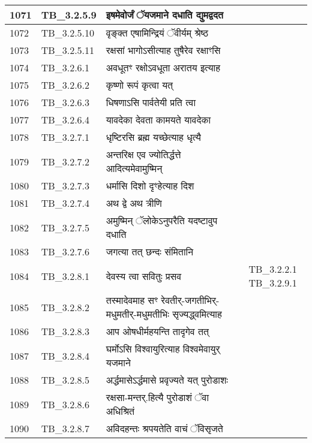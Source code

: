 \documentclass[17pt]{extarticle}
\begin{document}
\begin{longtable}{||p{0.4in}||p{0.9in}||p{4.0in}||p{0.9in}||}
        \hline
            1071 & TB\_3.2.5.9 & इषमेवोर्जं ॅयजमाने दधाति द्युमद्वदत &      \\
        \hline
            1072 & TB\_3.2.5.10 & वृङ्क्त एषामिन्द्रियं ॅवीर्यम् श्रेष्ठ &      \\
        \hline
            1073 & TB\_3.2.5.11 & रक्षसां भागोऽसीत्याह तुषैरेव रक्षाꣳसि &      \\
        \hline
            1074 & TB\_3.2.6.1 & अवधूतꣳ रक्षोऽवधूता अरातय इत्याह &      \\
        \hline
            1075 & TB\_3.2.6.2 & कृष्णो रूपं कृत्वा यत् &      \\
        \hline
            1076 & TB\_3.2.6.3 & धिषणाऽसि पार्वतेयी प्रति त्वा &      \\
        \hline
            1077 & TB\_3.2.6.4 & यावदेका देवता कामयते यावदेका &      \\
        \hline
            1078 & TB\_3.2.7.1 & धृष्टिरसि ब्रह्म यच्छेत्याह धृत्यै &      \\
        \hline
            1079 & TB\_3.2.7.2 & अन्तरिक्ष एव ज्योतिर्द्धत्ते आदित्यमेवामुष्मिन् &      \\
        \hline
            1080 & TB\_3.2.7.3 & धर्मासि दिशो दृꣳहेत्याह दिश &      \\
        \hline
            1081 & TB\_3.2.7.4 & अथ द्वे अथ त्रीणि &      \\
        \hline
            1082 & TB\_3.2.7.5 & अमुष्मिन् ॅलोकेऽनुपरैति यदष्टावुप दधाति &      \\
        \hline
            1083 & TB\_3.2.7.6 & जगत्या तत् छन्दः संमितानि &      \\
        \hline
            1084 & TB\_3.2.8.1 & देवस्य त्वा सवितुः प्रसव & TB\_3.2.2.1  TB\_3.2.9.1       \\
        \hline
            1085 & TB\_3.2.8.2 & तस्मादेवमाह सꣳ रेवतीर्{-}जगतीभिर्{-}मधुमतीर्{-}मधुमतीभिः सृज्यद्ध्वमित्याह &      \\
        \hline
            1086 & TB\_3.2.8.3 & आप ओषधीर्महयन्ति तादृगेव तत् &      \\
        \hline
            1087 & TB\_3.2.8.4 & घर्मोऽसि विश्वायुरित्याह विश्वमेवायुर् यजमाने &      \\
        \hline
            1088 & TB\_3.2.8.5 & अर्द्धमासेऽर्द्धमासे प्रवृज्यते यत् पुरोडाशः &      \\
        \hline
            1089 & TB\_3.2.8.6 & रक्षसा{-}मन्तर्.हित्यै पुरोडाशं ॅवा अधिश्रितं &      \\
        \hline
            1090 & TB\_3.2.8.7 & अविदहन्तः श्रपयतेति वाचं ॅविसृजते &      \\

\end{longtable}
\end{document}
